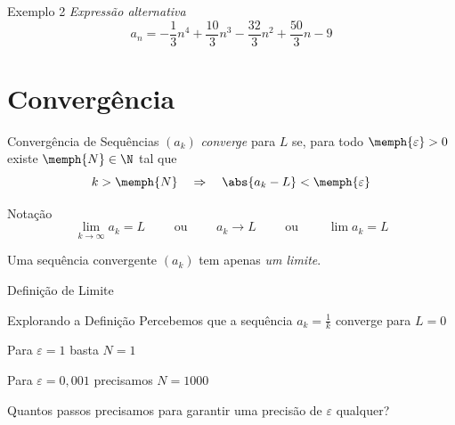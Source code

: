 \begin{frame}{Exemplo 2}
  \emph{Expressão alternativa}
  \[
    a_n = -\frac{1}{3}n^4 +\frac{10}{3}n^3 -\frac{32}{3}n^2 +\frac{50}{3}n -9
  \]
\end{frame}

\section{Convergência}

\begin{frame}{Convergência de Sequências}
    $(a_k)$ \emph{converge} para $L$ se, para todo $\memph{\varepsilon}>0$
    existe $\memph{N}\in \N$ tal que
    \[
    	k>\memph{N} \quad \Rightarrow  \quad \abs{a_k-L}<\memph{\varepsilon}
    \]

    \pause
    \vspace{\baselineskip}
    Notação
    \[
      \lim_{k\to \infty} a_k = L \qquad\text{ ou }\qquad
      a_k \to L                  \qquad\text{ ou }\qquad
      \lim a_k = L
    \]

    \pause
    \vspace{\baselineskip}
    Uma sequência convergente $(a_k)$ tem apenas \emph{um limite}.
\end{frame}

\begin{frame}{Definição de Limite}
  \centering
  \scalebox{0.9}{}
\end{frame}

\begin{frame}{Explorando a Definição}
    Percebemos que a sequência \(a_k = \frac{1}{k}\) converge para $L = 0$

    \pause
    \vspace{\baselineskip}
    Para $\varepsilon=1$     \tabto{28mm} basta      \tabto{50mm} $N=1$

    \pause
    Para $\varepsilon=0,001$ \tabto{28mm} precisamos \tabto{50mm} $N=1000$

    \pause
    \vspace{\baselineskip}
    Quantos passos precisamos para garantir uma precisão de $\varepsilon$ qualquer?

\end{frame}

